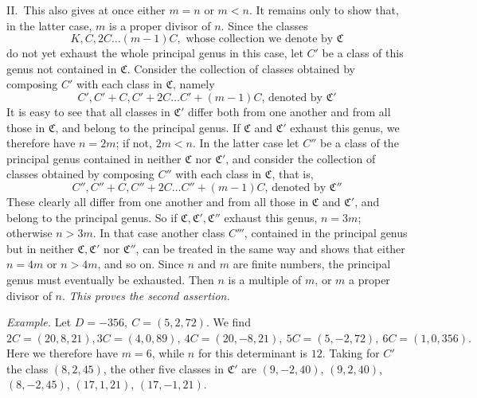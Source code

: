 II.\ This also gives at once either \(m=n\) or \(m<n\). It remains only to show that, in the latter case, \(m\) is a proper divisor of \(n\). Since the classes
\[K,C,2C\ldots(m-1)C,\text{ whose collection we denote by }\mathfrak C\]
do not yet exhaust the whole principal genus in this case, let \(C'\) be a class of this genus not contained in \(\mathfrak C\). Consider the collection of classes obtained by composing \(C'\) with each class in \(\mathfrak C\), namely
\[C',C'+C,C'+2C\ldots C'+(m-1)C\text{, denoted by }\mathfrak C'\]
It is easy to see that all classes in \(\mathfrak C'\) differ both from one another and from all those in \(\mathfrak C\), and belong to the principal genus. If \(\mathfrak C\) and \(\mathfrak C'\) exhaust this genus, we therefore have \(n=2m\); if not, \(2m<n\). In the latter case let \(C''\) be a class of the principal genus contained in neither \(\mathfrak C\) nor \(\mathfrak C'\), and consider the collection of classes obtained by composing \(C''\) with each class in \(\mathfrak C\), that is,
\[C'',C''+C,C''+2C\ldots C''+(m-1)C\text{, denoted by }\mathfrak C''\]
These clearly all differ from one another and from all those in \(\mathfrak C\) and \(\mathfrak C'\), and belong to the principal genus. So if \(\mathfrak C,\mathfrak C',\mathfrak C''\) exhaust this genus, \(n=3m\); otherwise \(n>3m\). In that case another class \(C'''\), contained in the principal genus but in neither \(\mathfrak C,\mathfrak C'\) nor \(\mathfrak C''\), can be treated in the same way and shows that either \(n=4m\) or \(n>4m\), and so on. Since \(n\) and \(m\) are finite numbers, the principal genus must eventually be exhausted. Then \(n\) is a multiple of \(m\), or \(m\) a proper divisor of \(n\). \textit{This proves the second assertion.}

\textit{Example.} Let \(D=-356,\ C=(5,2,72)\). We find \(2C=(20,8,21), 3C=(4,0,89),\ 4C=(20,-8,21),\ 5C=(5,-2,72),\ 6C=(1,0,356).\) Here
we therefore have \(m=6\), while \(n\) for this determinant is \(12\). Taking for \(C'\) the class \((8,2,45)\), the other five classes in \(\mathfrak C'\) are \((9,-2,40)\), \((9,2,40)\), \((8,-2,45)\), \((17,1,21)\), \((17,-1,21)\).
